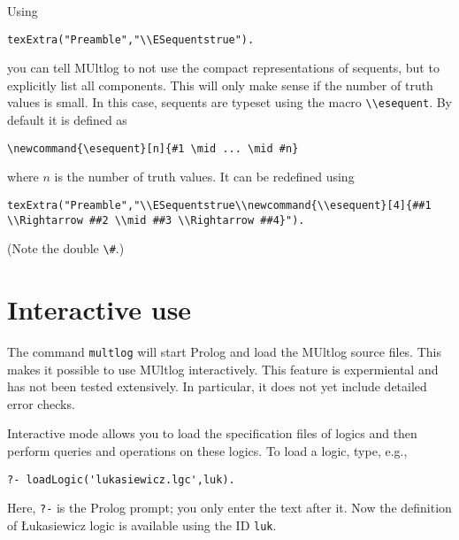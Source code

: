 \documentclass[
]{article}
\newcommand{\passthrough}[1]{#1}
\begin{document}
Using

\begin{lstlisting}
texExtra("Preamble","\\ESequentstrue").
\end{lstlisting}

you can tell MUltlog to not use the compact representations of sequents,
but to explicitly list all components. This will only make sense if the
number of truth values is small. In this case, sequents are typeset
using the macro \passthrough{\lstinline!\\esequent!}. By default it is
defined as

\begin{lstlisting}
\newcommand{\esequent}[n]{#1 \mid ... \mid #n}
\end{lstlisting}

where \(n\) is the number of truth values. It can be redefined using

\begin{lstlisting}
texExtra("Preamble","\\ESequentstrue\\newcommand{\\esequent}[4]{##1 \\Rightarrow ##2 \\mid ##3 \\Rightarrow ##4}").
\end{lstlisting}

(Note the double \passthrough{\lstinline!\#!}.)

\hypertarget{interactive-use}{%
\section{Interactive use}\label{interactive-use}}

The command \passthrough{\lstinline!multlog!} will start Prolog and load
the MUltlog source files. This makes it possible to use MUltlog
interactively. This feature is expermiental and has not been tested
extensively. In particular, it does not yet include detailed error
checks.

Interactive mode allows you to load the specification files of logics
and then perform queries and operations on these logics. To load a
logic, type, e.g.,

\begin{lstlisting}
?- loadLogic('lukasiewicz.lgc',luk).
\end{lstlisting}

Here, \passthrough{\lstinline!?-!} is the Prolog prompt; you only enter
the text after it. Now the definition of Łukasiewicz logic is available
using the ID \passthrough{\lstinline!luk!}.
\end{document}
